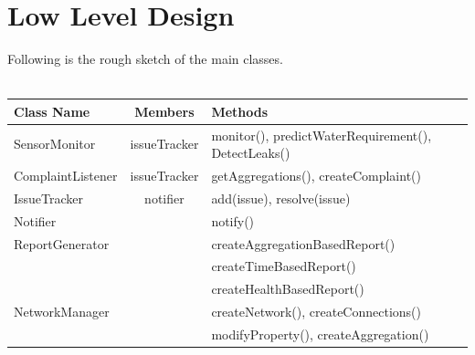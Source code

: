 \documentclass[12pt]{article}
\begin{document}
\section*{Low Level Design}
Following is the rough sketch of the main classes.\\\\
\begin{tabular}{|l|c|l|}
\hline
Class Name & Members & Methods\\
\hline
\hline
SensorMonitor & issueTracker & monitor(), predictWaterRequirement(), DetectLeaks()\\
\hline
ComplaintListener & issueTracker & getAggregations(), createComplaint()\\
\hline
IssueTracker & notifier & add(issue), resolve(issue)\\
\hline
Notifier & & notify()\\
\hline
ReportGenerator & & createAggregationBasedReport() \\&& createTimeBasedReport()\\&&createHealthBasedReport()\\
\hline
NetworkManager & & createNetwork(), createConnections()\\ &&modifyProperty(), createAggregation()\\
\hline 

\end{tabular}
\end{document}
